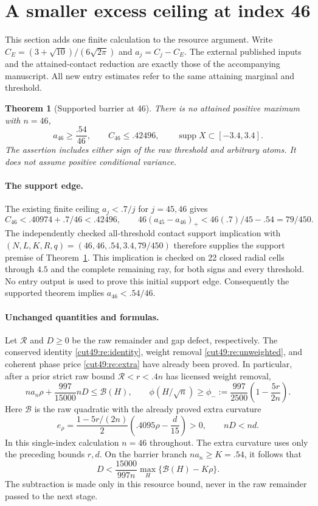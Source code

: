\documentclass[11pt,a4paper]{article}
\numberwithin{equation}{section}
\newtheorem{theorem}{Theorem}[section]
\theoremstyle{definition}
\theoremstyle{remark}
\begin{document}
\section{A smaller excess ceiling at index 46}\label{cut49:bar46:entry}
This section adds one finite calculation to the resource argument. Write
$C_E=(3+\sqrt{10})/(6\sqrt{2\pi})$ and $a_j=C_j-C_E$.
The external published inputs and the attained-contact reduction are
exactly those of the accompanying manuscript. All new entry estimates
refer to the same attaining marginal and threshold.

\begin{theorem}[Supported barrier at 46]\label{cut49:bar46:supported}
There is no attained positive maximum with $n=46$,
\[
 a_{46}\ge\frac{.54}{46},\qquad C_{46}\le.42496,
 \qquad \operatorname{supp}X\subset[-3.4,3.4].
\]
The assertion includes either sign of the raw threshold and arbitrary
atoms. It does not assume positive conditional variance.
\end{theorem}

\paragraph{The support edge.}
The existing finite ceiling $a_j<.7/j$ for $j=45,46$ gives
\[
 C_{46}<.40974+.7/46<.42496,\qquad
 46(a_{45}-a_{46})_+<46(.7)/45-.54=79/450.
\]
The independently checked all-threshold contact support implication
with $(N,L,K,R,q)=(46,46,.54,3.4,79/450)$ therefore supplies the
support premise of Theorem~\ref{cut49:bar46:supported}.
This implication is checked on 22 closed radial cells through $4.5$
and the complete remaining ray, for both signs and every threshold.
No entry output is used to prove this initial support edge.
Consequently the supported theorem implies $a_{46}<.54/46$.

\paragraph{Unchanged quantities and formulas.}
Let $\mathcal R$ and $D\ge0$ be the raw remainder and gap defect,
respectively. The conserved identity \eqref{cut49:re:identity}, weight removal
\eqref{cut49:re:unweighted}, and coherent phase price \eqref{cut49:re:extra}
have already been proved. In particular, after a prior strict raw bound
$\mathcal R<r<.4n$ has licensed weight removal,
\[
 na_n\rho+\frac{997}{15000}nD
 \le\mathcal B(H),\qquad
 \phi(H/\sqrt n)\ge\phi_-:=\frac{997}{2500}
                \left(1-\frac{5r}{2n}\right).
\]
Here $\mathcal B$ is the raw quadratic with the already proved extra
curvature
\[
 e_\rho=\frac{1-5r/(2n)}2\left(.4095\rho-\frac d{15}\right)>0,
 \qquad nD<nd.
\]
In this single-index calculation $n=46$ throughout. The extra curvature
uses only the preceding bounds $r,d$. On the barrier branch
$na_n\ge K=.54$, it follows that
\begin{equation}\label{cut49:bar46:resource}
 D<\frac{15000}{997n}\max_H\{\mathcal B(H)-K\rho\}.
\end{equation}
The subtraction is made only in this resource bound, never in the raw
remainder passed to the next stage.
\end{document}
